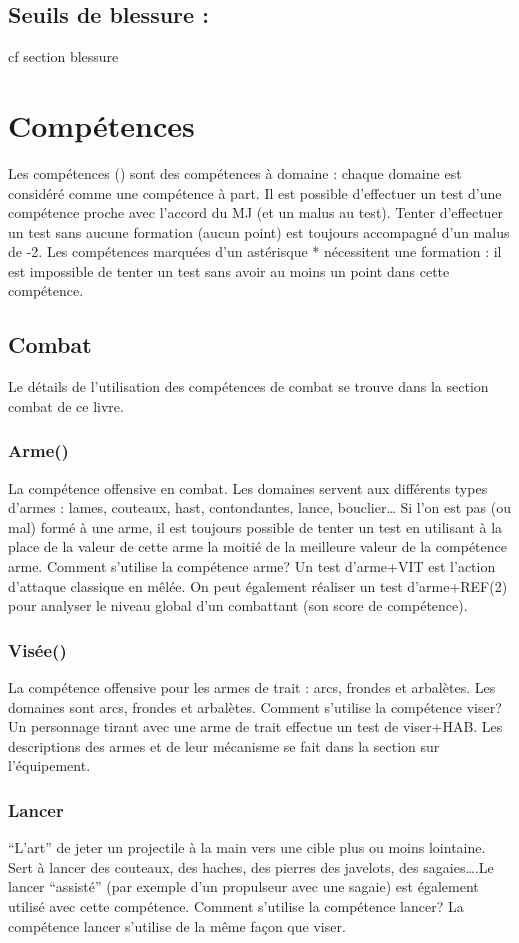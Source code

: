 \documentclass[10pt,a4paper,twocolumn]{book}
\begin{document}
\section{Seuils de blessure :}
cf section blessure

\chapter{Compétences}
Les compétences () sont des compétences à domaine : chaque domaine est considéré comme une compétence à part.
Il est possible d’effectuer un test d’une compétence proche avec l’accord du MJ (et un malus au test).
Tenter d’effectuer un test sans aucune formation (aucun point) est toujours accompagné d’un malus de -2.
Les compétences marquées d’un astérisque * nécessitent une formation : il est impossible de tenter un test sans avoir au moins un point dans cette compétence.


\section{Combat}
Le détails de l’utilisation des compétences de combat se trouve dans la section combat de ce livre.
\subsection*{Arme()}
La compétence offensive en combat. Les domaines servent aux différents types d’armes : lames, couteaux, hast, contondantes, lance, bouclier…
Si l’on est pas (ou mal)  formé à une arme, il est toujours possible de tenter un test en utilisant à la place de la valeur de cette arme la moitié de la meilleure valeur de la compétence arme.
Comment s’utilise la compétence arme?
Un test d’arme+VIT est l’action d’attaque classique en mêlée. On peut également réaliser un test d’arme+REF(2) pour analyser le niveau global d’un combattant (son score de compétence).
\subsection*{Visée()}
La compétence offensive pour les armes de trait : arcs, frondes et arbalètes.
Les domaines sont arcs, frondes et arbalètes.
Comment s’utilise la compétence viser?
Un personnage tirant avec une arme de trait effectue un test de viser+HAB. Les descriptions des armes et de leur mécanisme se fait dans la section sur l’équipement.
\subsection*{Lancer}
“L’art” de jeter un projectile à la main vers une cible plus ou moins lointaine. Sert à lancer des couteaux, des haches, des pierres des javelots, des sagaies….Le lancer “assisté” (par exemple d’un propulseur avec une sagaie) est également utilisé avec cette compétence. 
Comment s’utilise la compétence lancer?
La compétence lancer s’utilise de la même façon que viser.
\end{document}
